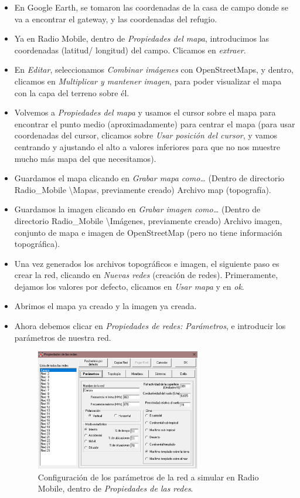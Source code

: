 \documentclass[12pt]{article}
\begin{document}
	\begin{itemize}
		\item En Google Earth, se tomaron las coordenadas de la casa de campo donde se va a encontrar el gateway, y las coordenadas del refugio.
		\item Ya en Radio Mobile, dentro de \textit{Propiedades del mapa}, introducimos las coordenadas (latitud/ longitud) del campo. Clicamos en \textit{extraer}.
		\item En \textit{Editar}, seleccionamos \textit{Combinar imágenes} con OpenStreetMaps, y dentro, clicamos en \textit{Multiplicar y mantener imagen}, para poder visualizar el mapa con la capa del terreno sobre él. 
		\item Volvemos a \textit{Propiedades del mapa} y usamos el cursor sobre el mapa para encontrar el punto medio (aproximadamente) para centrar el mapa (para usar coordenadas del cursor, clicamos sobre \textit{Usar posición del cursor}, y vamos centrando y ajustando el alto a valores inferiores para que no nos muestre mucho más mapa del que necesitamos).
		\item Guardamos el mapa clicando en \textit{Grabar mapa como…} (Dentro de directorio Radio\_Mobile \textbackslash Mapas, previamente creado) Archivo map (topografía).
		\item Guardamos la imagen clicando en \textit{Grabar imagen como…}  (Dentro de directorio Radio\_Mobile \textbackslash Imágenes, previamente creado) Archivo imagen, conjunto de mapa e imagen de OpenStreetMap (pero no tiene información topográfica).
		\item Una vez generados los archivos topográficos e imagen, el siguiente paso es crear la red, clicando en \textit{Nuevas redes} (creación de redes). Primeramente, dejamos los valores por defecto, clicamos en \textit{Usar mapa} y en \textit{ok}.
		\item Abrimos el mapa ya creado y la imagen ya creada.
		\item Ahora debemos clicar en \textit{Propiedades de redes: Parámetros}, e introducir los parámetros de nuestra red.
		
		\begin{figure}[h!]
			\begin{center}
				\includegraphics[width=0.68\textwidth]{img/prop_redes_radiomobile.png}
				\caption{Configuración de los parámetros de la red a simular en Radio Mobile, dentro de \textit{Propiedades de las redes}.}
				\label{Prop redes param radiomobile}
			\end{center}
		\end{figure}
		

\end{itemize}
\end{document}
